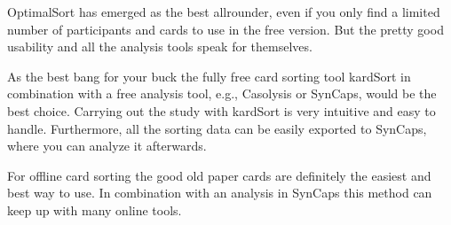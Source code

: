 OptimalSort has emerged as the best allrounder, even if you only find a 
limited number of participants and cards to use in the free version. But 
the pretty good usability and all the analysis tools speak for themselves.

As the best bang for your buck the fully free card sorting tool kardSort 
in combination with a free analysis tool, e.g., Casolysis or SynCaps, would
be the best choice. Carrying out the study with kardSort is very intuitive and 
easy to handle. Furthermore, all the sorting data can be easily exported 
to SynCaps, where you can analyze it afterwards.

For offline card sorting the good old paper cards are definitely the easiest
and best way to use. In combination with an analysis in SynCaps this
method can keep up with many online tools.

